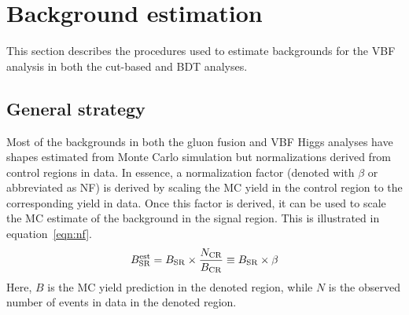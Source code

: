 



\section{Background estimation}
\label{sec:HWWbkg}

This section describes the procedures used to estimate backgrounds for the VBF analysis in both the cut-based and BDT analyses. 

\subsection{General strategy}

Most of the backgrounds in both the gluon fusion and VBF Higgs analyses have shapes estimated from Monte Carlo simulation but normalizations derived from control regions in data. In essence, a normalization factor (denoted with $\beta$ or abbreviated as NF) is derived by scaling the MC yield in the control region to the corresponding yield in data. Once this factor is derived, it can be used to scale the MC estimate of the background in the signal region. This is illustrated in equation~\ref{eqn:nf}.
%
\begin{equation}
B_{\rm SR}^{\rm est} = B_{\rm SR} \times \frac{N_{\rm CR}}{B_{\rm CR}} \equiv B_{\rm SR} \times \beta
\label{eqn:nf}
\end{equation}
%
Here, $B$ is the MC yield prediction in the denoted region, while $N$ is the observed number of events in data in the denoted region. 


